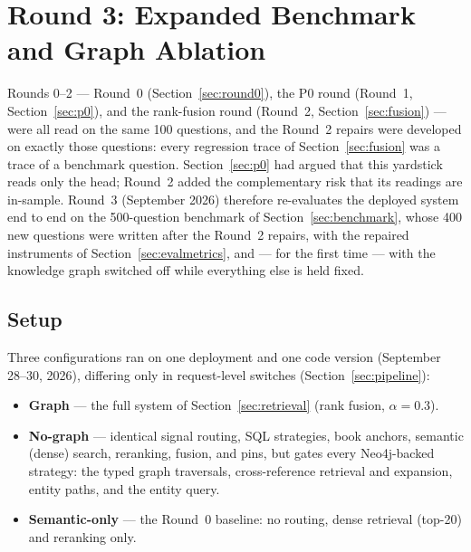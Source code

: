 
\section{Round 3: Expanded Benchmark and Graph Ablation}
\label{sec:round3}

Rounds 0--2 --- Round~0 (Section~\ref{sec:round0}), the P0 round
(Round~1, Section~\ref{sec:p0}), and the rank-fusion round (Round~2,
Section~\ref{sec:fusion}) --- were all read on the same 100 questions,
and the Round~2 repairs were developed on exactly those questions:
every regression trace of Section~\ref{sec:fusion} was a trace of a
benchmark question.
Section~\ref{sec:p0} had argued that this yardstick reads only the head;
Round~2 added the complementary risk that its readings are in-sample. Round~3 (September 2026) therefore re-evaluates the deployed
system end to end on the 500-question benchmark of
Section~\ref{sec:benchmark}, whose 400 new questions were written after
the Round~2 repairs, with the repaired instruments of
Section~\ref{sec:evalmetrics}, and --- for the first time --- with the
knowledge graph switched off while everything else is held fixed.

\subsection{Setup}

Three configurations ran on one deployment and one code version
(September 28--30, 2026), differing only in request-level switches
(Section~\ref{sec:pipeline}):

\begin{itemize}
\item \textbf{Graph} --- the full system of Section~\ref{sec:retrieval}
(rank fusion, $\alpha=0.3$).
\item \textbf{No-graph} --- identical signal routing, SQL strategies,
book anchors, semantic (dense) search, reranking, fusion, and pins, but
 gates every Neo4j-backed strategy: the typed
graph traversals, cross-reference retrieval and expansion, entity paths,
and the entity query.
\item \textbf{Semantic-only} --- the Round~0 baseline: no routing, dense
retrieval (top-20) and reranking only.
\end{itemize}

